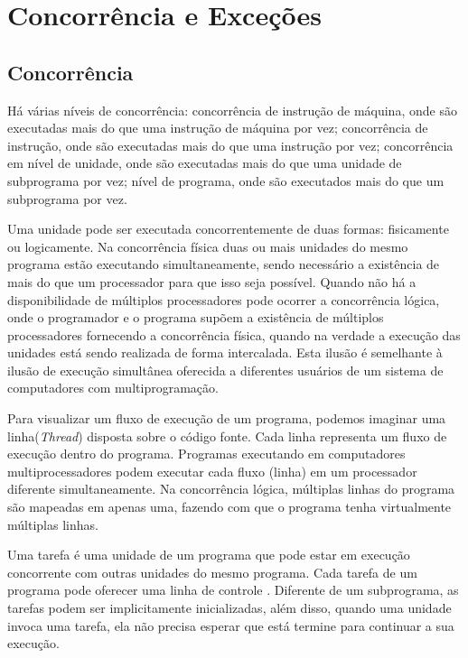 \chapter{Concorrência e Exceções}

\section{Concorrência}

Há várias níveis de concorrência: concorrência de instrução de máquina, onde são
executadas mais do que uma instrução de máquina por vez; concorrência de
instrução, onde são executadas mais do que uma instrução por vez;
concorrência em nível de unidade, onde são executadas mais do que uma
unidade de subprograma por vez; nível de programa, onde são executados mais
do que um subprograma por vez. 

Uma unidade pode ser executada concorrentemente de duas formas: fisicamente
ou logicamente. Na concorrência física duas ou mais unidades do mesmo
programa estão executando simultaneamente, sendo necessário a existência de
mais do que um processador para que isso seja possível. Quando não há a
disponibilidade de múltiplos processadores pode ocorrer a concorrência
lógica, onde o programador e o programa supõem a existência de múltiplos
processadores fornecendo a concorrência física, quando na verdade a
execução das unidades está sendo realizada de forma intercalada. Esta
ilusão é semelhante à ilusão de execução simultânea oferecida a diferentes
usuários de um sistema de computadores com multiprogramação.

Para visualizar um fluxo de execução de um programa, podemos imaginar uma
linha({\it Thread}) disposta sobre o código fonte. Cada linha representa um
fluxo de execução dentro do programa. Programas executando em computadores
multiprocessadores podem executar cada fluxo (linha) em um processador
diferente simultaneamente. Na concorrência lógica,  múltiplas linhas do
programa são mapeadas em apenas uma, fazendo com que o programa tenha
virtualmente múltiplas linhas. 

Uma tarefa é uma unidade de um programa que pode estar em execução
concorrente com outras unidades do mesmo programa. Cada tarefa de um
programa pode oferecer uma linha de controle \cite{sebesta}. Diferente de
um subprograma, as tarefas podem ser implicitamente inicializadas, além
disso, quando uma unidade invoca uma tarefa, ela não precisa esperar que
está termine para continuar a sua execução.

